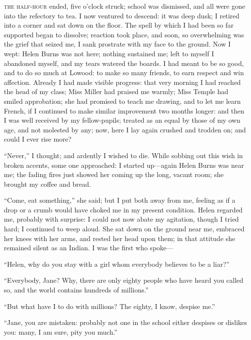 
 \textsc{the half-hour} ended, five o'clock struck; school was dismissed, and
all were gone into the refectory to tea. I now ventured to descend: it
was deep dusk; I retired into a corner and sat down on the floor. The
spell by which I had been so far supported began to dissolve; reaction
took place, and soon, so overwhelming was the grief that seized me, I
sank prostrate with my face to the ground. Now I wept: Helen Burns was
not here; nothing sustained me; left to myself I abandoned myself, and
my tears watered the boards. I had meant to be so good, and to do so
much at Lowood: to make so many friends, to earn respect and win
affection. Already I had made visible progress: that very morning I had
reached the head of my class; Miss Miller had praised me warmly; Miss
Temple had smiled approbation; she had promised to teach me drawing, and
to let me learn French, if I continued to make similar improvement two
months longer: and then I was well received by my fellow-pupils; treated
as an equal by those of my own age, and not molested by any; now, here I
lay again crushed and trodden on; and could I ever rise more?

\enquote{Never,} I thought; and ardently I wished to die. While sobbing
out this wish in broken accents, some one approached: I started
up---again Helen Burns was near me; the fading fires just showed her
coming up the long, vacant room; she brought my coffee and bread.

\enquote{Come, eat something,} she said; but I put both away from me,
feeling as if a drop or a crumb would have choked me in my present
condition. Helen regarded me, probably with surprise: I could not now
abate my agitation, though I tried hard; I continued to weep aloud. She
sat down on the ground near me, embraced her knees with her arms, and
rested her head upon them; in that attitude she remained silent as an
Indian. I was the first who spoke---

\enquote{Helen, why do you stay with a girl whom everybody believes to
be a liar?}

\enquote{Everybody, Jane? Why, there are only eighty people who have
heard you called so, and the world contains hundreds of millions.}

\enquote{But what have I to do with millions? The eighty, I know,
despise me.}

\enquote{Jane, you are mistaken: probably not one in the school either
despises or dislikes you: many, I am sure, pity you much.}

